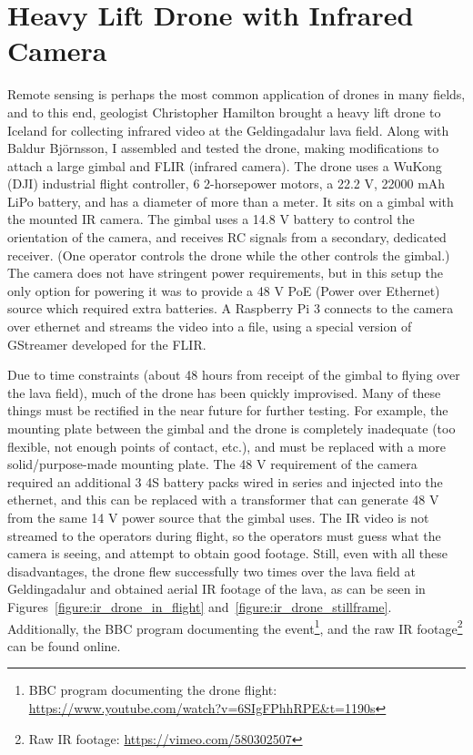\section{Heavy Lift Drone with Infrared Camera}
\label{section:ir_drone}

Remote sensing is perhaps the most common application of drones in many fields,
and to this end, geologist Christopher Hamilton brought a heavy lift drone to Iceland for collecting infrared video
at the Geldingadalur lava field.
Along with Baldur Björnsson, I assembled and tested the drone,
making modifications to attach a large gimbal and FLIR (infrared camera).
The drone uses a WuKong (DJI) industrial flight controller,
6 2-horsepower motors,
a 22.2 V, 22000 mAh LiPo battery,
and has a diameter of more than a meter.
It sits on a gimbal with the mounted IR camera.
The gimbal uses a 14.8 V battery to control the orientation of the camera,
and receives RC signals from a secondary, dedicated receiver.
(One operator controls the drone while the other controls the gimbal.)
The camera does not have stringent power requirements,
but in this setup the only option for powering it was to provide
a 48 V PoE (Power over Ethernet) source which required extra batteries.
A Raspberry Pi 3 connects to the camera over ethernet and streams the video into a file,
using a special version of GStreamer developed for the FLIR.

Due to time constraints (about 48 hours from receipt of the gimbal
to flying over the lava field),
much of the drone has been quickly improvised.
Many of these things must be rectified in the near future for further testing.
For example, the mounting plate between the gimbal and the drone
is completely inadequate (too flexible, not enough points of contact, etc.),
and must be replaced with a more solid/purpose-made mounting plate.
The 48 V requirement of the camera required an additional 3 4S battery packs
wired in series and injected into the ethernet,
and this can be replaced with a transformer that can generate 48 V
from the same 14 V power source that the gimbal uses.
The IR video is not streamed to the operators during flight,
so the operators must guess what the camera is seeing, and attempt to obtain good footage.
Still, even with all these disadvantages, the drone flew successfully two times
over the lava field at Geldingadalur and obtained aerial IR footage of the lava,
as can be seen in Figures~\ref{figure:ir_drone_in_flight} and~\ref{figure:ir_drone_stillframe}.
Additionally, the BBC program documenting the event\footnote{BBC program documenting the drone flight: \url{https://www.youtube.com/watch?v=6SIgFPhhRPE&t=1190s}}, and the raw IR footage\footnote{Raw IR footage: \url{https://vimeo.com/580302507}} can be found online.

